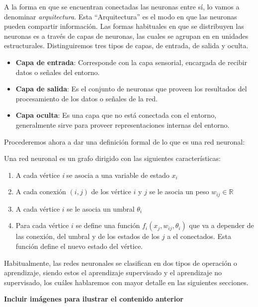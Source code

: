 A la forma en que se encuentran conectadas las neuronas entre sí, lo
vamos a denominar \textsl{\gls{arquitectura}}. Esta ``Arquitectura''
es el modo en que las neuronas pueden compartir información. Las
formas habituales en que se distribuyen las neuronas es a través de
capas de neuronas, las cuales se agrupan en en unidades
estructurales. Distinguiremos tres tipos de capas, de entrada, de
salida y oculta.\\

\begin{itemize}
\item \textbf{Capa de entrada}: Corresponde con la capa sensorial,
  encargada de recibir datos o señales del entorno.
\item \textbf{Capa de salida}: Es el conjunto de neuronas que proveen
  los resultados del procesamiento de los datos o señales de la red.
\item \textbf{Capa oculta}: Es una capa que no está conectada con el
  entorno, generalmente sirve para proveer representaciones internas
  del entorno.
\end{itemize}

Procederemos ahora a dar una definición formal de lo que es una red
neuronal:

\theoremstyle{definition}
\begin{definition}
  Una red neuronal es un grafo dirigido con las siguientes
  características:
  \begin{enumerate}
  \item A cada vértice \textsl{i} se asocia a una variable de estado
    $x_i$
  \item A cada conexión $(i,j)$ de los vértice $i$ y $j$ se le asocia un
    peso $w_{ij} \in \mathbb{R}$
  \item A cada vértice $i$ se le asocia un umbral $\theta_i$
  \item Para cada vértice $i$ se define una función $f_i(x_j, w_{ij},
    \theta_i)$ que va a depender de las conexión, del umbral y de los
    estados de los $j$ a el conectados. Esta función define el nuevo
    estado del vértice.
  \end{enumerate}
\end{definition}

Habitualmente, las redes neuronales se clasifican en dos tipos de
operación o aprendizaje, siendo estos el aprendizaje supervisado y el
aprendizaje no supervisado, los cuáles hablaremos con mayor detalle en
las siguientes secciones.

\textbf{Incluir imágenes para ilustrar el contenido anterior}

